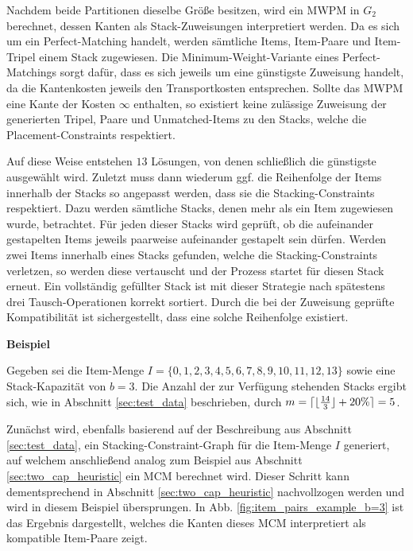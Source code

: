 Nachdem beide Partitionen dieselbe Größe besitzen, wird ein \textsc{MWPM} in $G_2$ berechnet, dessen Kanten
als Stack-Zuweisungen interpretiert werden. Da es sich um ein Perfect-Matching handelt, werden sämtliche Items, Item-Paare
und Item-Tripel einem Stack zugewiesen. Die Minimum-Weight-Variante eines Perfect-Matchings sorgt dafür, dass es sich
jeweils um eine günstigste Zuweisung handelt, da die Kantenkosten jeweils den Transportkosten entsprechen.
Sollte das \textsc{MWPM} eine Kante der Kosten $\infty$ enthalten, so existiert keine zulässige Zuweisung
der generierten Tripel, Paare und Unmatched-Items zu den Stacks, welche die Placement-Constraints respektiert.

Auf diese Weise entstehen $13$ Lösungen, von denen schließlich die günstigste ausgewählt wird.
Zuletzt muss dann wiederum ggf. die Reihenfolge der Items innerhalb der Stacks so angepasst werden,
dass sie die Stacking-Constraints respektiert. Dazu werden sämtliche Stacks, denen mehr als
ein Item zugewiesen wurde, betrachtet. Für jeden dieser Stacks wird geprüft, ob die aufeinander
gestapelten Items jeweils paarweise aufeinander gestapelt sein dürfen.
Werden zwei Items innerhalb eines Stacks gefunden, welche die Stacking-Constraints verletzen, so werden diese
vertauscht und der Prozess startet für diesen Stack erneut. Ein vollständig gefüllter Stack ist mit dieser
Strategie nach spätestens drei Tausch-Operationen korrekt sortiert. Durch die bei der Zuweisung geprüfte
Kompatibilität ist sichergestellt, dass eine solche Reihenfolge existiert.

\textbf{Beispiel}

Gegeben sei die Item-Menge $I = \{0, 1, 2, 3, 4, 5, 6, 7, 8, 9, 10, 11, 12, 13\}$ sowie eine Stack-Kapazität von $b = 3$.
Die Anzahl der zur Verfügung stehenden Stacks ergibt sich, wie in Abschnitt \ref{sec:test_data} beschrieben,
durch $m = \lceil\lfloor\frac{14}{3}\rfloor + 20 \%\rceil = 5$.

Zunächst wird, ebenfalls basierend auf der Beschreibung aus Abschnitt \ref{sec:test_data}, ein Stacking-Constraint-Graph
für die Item-Menge $I$ generiert, auf welchem anschließend analog zum Beispiel aus Abschnitt \ref{sec:two_cap_heuristic} ein
\textsc{MCM} berechnet wird. Dieser Schritt kann dementsprechend in Abschnitt \ref{sec:two_cap_heuristic} nachvollzogen werden
und wird in diesem Beispiel übersprungen. In Abb. \ref{fig:item_pairs_example_b=3} ist das Ergebnis dargestellt,
welches die Kanten dieses \textsc{MCM} interpretiert als kompatible Item-Paare zeigt.

